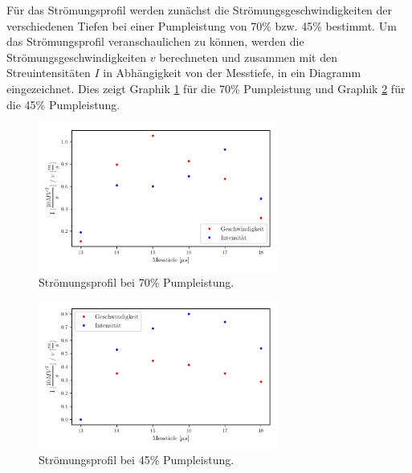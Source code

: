 Für das Strömungsprofil werden zunächst die Strömungsgeschwindigkeiten der verschiedenen Tiefen bei einer Pumpleistung von 
70\% bzw. 45\% bestimmt. 
Um das Strömungsprofil veranschaulichen zu können, werden die Strömungsgeschwindigkeiten $v$ berechneten und zusammen mit den Streuintensitäten $I$
in Abhängigkeit von der Messtiefe, in ein Diagramm eingezeichnet. Dies zeigt Graphik \ref{fig:70P} für die 70\% Pumpleistung und Graphik \ref{fig:45P} 
für die 45\% Pumpleistung.

\begin{figure}
    \centering
    \includegraphics[width = 0.70\textwidth]{plot2.pdf}
    \caption{Strömungsprofil bei 70\% Pumpleistung.}
    \label{fig:70P}
\end{figure}

\begin{figure}
    \centering
    \includegraphics[width = 0.70\textwidth]{plot3.pdf}
    \caption{Strömungsprofil bei 45\% Pumpleistung.}
    \label{fig:45P}
\end{figure}
